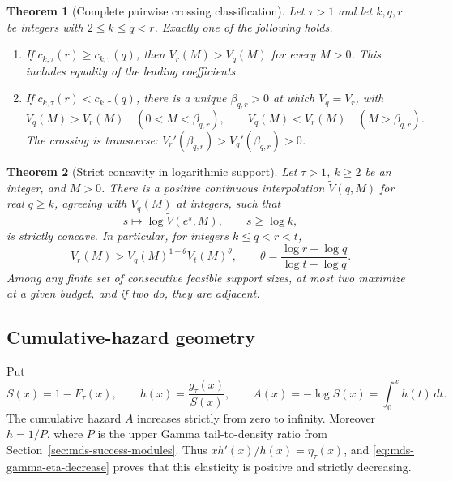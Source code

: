 \documentclass[11pt]{article}
\newtheorem{theorem}{Theorem}[section]
\theoremstyle{definition}
\theoremstyle{remark}
\newcommand{\1}{\mathbf 1}
\begin{document}
\begin{theorem}[Complete pairwise crossing classification]
\label{thm:mds-pairwise-crossing}
Let \(\tau>1\) and let \(k,q,r\) be integers with
\(2\le k\le q<r\). Exactly one of the following holds.
\begin{enumerate}[label=(\roman*)]
\item If \(c_{k,\tau}(r)\ge c_{k,\tau}(q)\), then
\(V_r(M)>V_q(M)\) for every \(M>0\). This includes equality of
the leading coefficients.
\item If \(c_{k,\tau}(r)<c_{k,\tau}(q)\), there is a unique
\(\beta_{q,r}>0\) at which \(V_q=V_r\), with
\[
 V_q(M)>V_r(M)\quad(0<M<\beta_{q,r}),\qquad
 V_q(M)<V_r(M)\quad(M>\beta_{q,r}).
\]
The crossing is transverse:
\(V_r'(\beta_{q,r})>V_q'(\beta_{q,r})>0\).
\end{enumerate}
\end{theorem}

\begin{theorem}[Strict concavity in logarithmic support]
\label{thm:mds-log-support-concavity}
Let \(\tau>1\), \(k\ge2\) be an integer, and \(M>0\).
There is a positive continuous interpolation
\(\widetilde V(q,M)\) for real \(q\ge k\), agreeing with
\(V_q(M)\) at integers, such that
\[
 s\longmapsto\log\widetilde V(e^s,M),\qquad s\ge\log k,
\]
is strictly concave. In particular, for integers \(k\le q<r<t\),
\begin{equation}\label{eq:mds-geometric-support-interpolation}
 V_r(M)>V_q(M)^{1-\theta}V_t(M)^\theta,
 \qquad \theta=\frac{\log r-\log q}{\log t-\log q}.
\end{equation}
Among any finite set of consecutive feasible support sizes, at most
two maximize at a given budget, and if two do, they are adjacent.
\end{theorem}

\subsection{Cumulative-hazard geometry}

Put
\[
 S(x)=1-F_\tau(x),\qquad h(x)=\frac{g_\tau(x)}{S(x)},\qquad
 A(x)=-\log S(x)=\int_0^x h(t)\,dt.
\]
The cumulative hazard \(A\) increases strictly from zero to infinity.
Moreover \(h=1/P\), where \(P\) is the upper Gamma tail-to-density
ratio from Section~\ref{sec:mds-success-modules}. Thus
\(xh'(x)/h(x)=\eta_\tau(x)\), and
\eqref{eq:mds-gamma-eta-decrease} proves that this elasticity is
positive and strictly decreasing.
\end{document}
